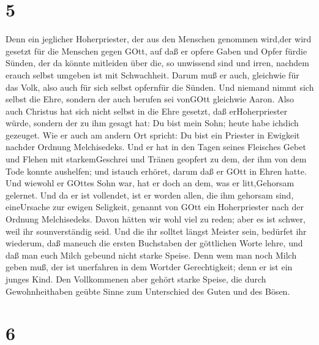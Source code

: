 \hypertarget{section-3}{%
\section{5}\label{section-3}}

 Denn ein jeglicher Hoherpriester, der aus den Menschen
genommen wird,der wird gesetzt für die Menschen gegen GOtt, auf daß er
opfere Gaben und Opfer fürdie Sünden,  der da könnte
mitleiden über die, so unwissend sind und irren, nachdem erauch selbst
umgeben ist mit Schwachheit.  Darum muß er auch, gleichwie
für das Volk, also auch für sich selbst opfernfür die Sünden.
 Und niemand nimmt sich selbst die Ehre, sondern der auch
berufen sei vonGOtt gleichwie Aaron.  Also auch Christus hat
sich nicht selbst in die Ehre gesetzt, daß erHoherpriester würde,
sondern der zu ihm gesagt hat: Du bist mein Sohn; heute habe ichdich
gezeuget.  Wie er auch am andern Ort spricht: Du bist ein
Priester in Ewigkeit nachder Ordnung Melchisedeks.  Und er
hat in den Tagen seines Fleisches Gebet und Flehen mit starkemGeschrei
und Tränen geopfert zu dem, der ihm von dem Tode konnte aushelfen; und
istauch erhöret, darum daß er GOtt in Ehren hatte.  Und
wiewohl er GOttes Sohn war, hat er doch an dem, was er litt,Gehorsam
gelernet.  Und da er ist vollendet, ist er worden allen, die
ihm gehorsam sind, eineUrsache zur ewigen Seligkeit, 
genannt von GOtt ein Hoherpriester nach der Ordnung Melchisedeks.
 Davon hätten wir wohl viel zu reden; aber es ist schwer,
weil ihr sounverständig seid.  Und die ihr solltet längst
Meister sein, bedürfet ihr wiederum, daß maneuch die ersten Buchstaben
der göttlichen Worte lehre, und daß man euch Milch gebeund nicht starke
Speise.  Denn wem man noch Milch geben muß, der ist
unerfahren in dem Wortder Gerechtigkeit; denn er ist ein junges Kind.
 Den Vollkommenen aber gehört starke Speise, die durch
Gewohnheithaben geübte Sinne zum Unterschied des Guten und des Bösen.

\hypertarget{section-4}{%
\section{6}\label{section-4}}

